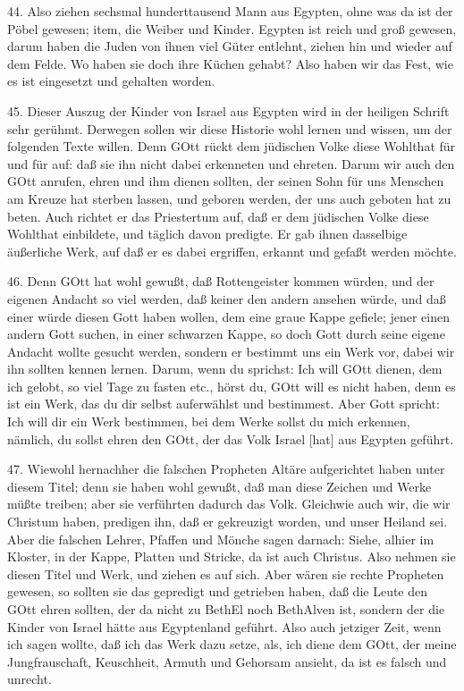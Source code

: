 44. Also ziehen sechsmal hunderttausend Mann aus Egypten, ohne was da ist der Pöbel gewesen; item, die Weiber und Kinder. Egypten ist reich und groß gewesen, darum haben die Juden von ihnen viel Güter entlehnt, ziehen hin und wieder auf dem Felde. Wo haben sie doch ihre Küchen gehabt? Also haben wir das Fest, wie es ist eingesetzt und gehalten worden.

45. Dieser Auszug der Kinder von Israel aus Egypten wird in der heiligen Schrift sehr gerühmt. Derwegen sollen wir diese Historie wohl lernen und wissen, um der folgenden Texte willen. Denn GOtt rückt dem jüdischen Volke diese Wohlthat für und für auf: daß sie ihn nicht dabei erkenneten und ehreten. Darum wir auch den GOtt anrufen, ehren und ihm dienen sollten, der seinen Sohn für uns Menschen am Kreuze hat sterben lassen, und geboren werden, der uns auch geboten hat zu beten. Auch richtet er das Priestertum auf, daß er dem jüdischen Volke diese Wohlthat einbildete, und täglich davon predigte. Er gab ihnen dasselbige äußerliche Werk, auf daß er es dabei ergriffen, erkannt und gefaßt werden möchte.

46. Denn GOtt hat wohl gewußt, daß Rottengeister kommen würden, und der eigenen Andacht
so viel werden, daß keiner den andern ansehen würde, und daß einer würde diesen Gott haben wollen, dem eine graue Kappe gefiele; jener einen andern Gott suchen, in einer schwarzen Kappe, so doch Gott durch seine eigene Andacht wollte gesucht werden, sondern er bestimmt uns ein Werk vor, dabei wir ihn sollten kennen lernen. Darum, wenn du sprichst: Ich will GOtt dienen, dem ich gelobt, so viel Tage zu fasten etc., hörst du, GOtt will es nicht haben, denn es ist ein Werk, das du dir selbst auferwählst und bestimmest. Aber Gott spricht: Ich will dir ein Werk bestimmen, bei dem Werke sollst du mich erkennen, nämlich, du sollst ehren den GOtt, der das Volk Israel [hat] aus Egypten geführt.

47. Wiewohl hernachher die falschen Propheten Altäre aufgerichtet haben unter diesem Titel; denn sie haben wohl gewußt, daß man diese Zeichen und Werke müßte treiben; aber sie verführten dadurch das Volk. Gleichwie auch wir, die wir Christum haben, predigen ihn, daß er gekreuzigt worden, und unser Heiland sei. Aber die falschen Lehrer, Pfaffen und Mönche sagen darnach: Siehe, alhier im Kloster, in der Kappe, Platten und Stricke, da ist auch Christus. Also nehmen sie diesen Titel und Werk, und ziehen es auf sich. Aber wären sie rechte Propheten gewesen, so sollten sie das gepredigt und getrieben haben, daß die Leute den GOtt ehren sollten, der da nicht zu BethEl noch BethAlven ist, sondern der die Kinder von Israel hätte aus Egyptenland geführt. Also auch jetziger Zeit, wenn ich sagen wollte, daß ich das Werk dazu setze, als, ich diene dem GOtt, der meine Jungfrauschaft, Keuschheit, Armuth und Gehorsam ansieht, da ist es falsch und unrecht.

